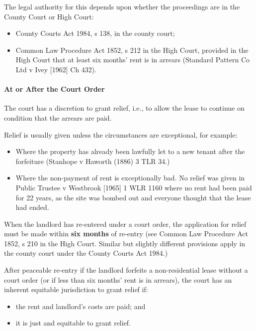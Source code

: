 \documentclass[
]{article}
\providecommand{\tightlist}{%
  \setlength{\itemsep}{0pt}\setlength{\parskip}{0pt}}
\begin{document}
The legal authority for this depends upon whether the proceedings are in
the County Court or High Court:

\begin{itemize}
\tightlist
\item
  County Courts Act 1984, s 138, in the county court;
\item
  Common Law Procedure Act 1852, s 212 in the High Court, provided in
  the High Court that at least six months' rent is in arrears (Standard
  Pattern Co Ltd v Ivey {[}1962{]} Ch 432).
\end{itemize}

\hypertarget{at-or-after-the-court-order}{%
\paragraph{At or After the Court
Order}\label{at-or-after-the-court-order}}

The court has a discretion to grant relief, i.e., to allow the lease to
continue on condition that the arrears are paid.

Relief is usually given unless the circumstances are exceptional, for
example:

\begin{itemize}
\tightlist
\item
  Where the property has already been lawfully let to a new tenant after
  the forfeiture (Stanhope v Haworth (1886) 3 TLR 34.)
\item
  Where the non-payment of rent is exceptionally bad. No relief was
  given in Public Trustee v Westbrook {[}1965{]} 1 WLR 1160 where no
  rent had been paid for 22 years, as the site was bombed out and
  everyone thought that the lease had ended.
\end{itemize}

When the landlord has re-entered under a court order, the application
for relief must be made within \textbf{six months} of re-entry (see
Common Law Procedure Act 1852, s 210 in the High Court. Similar but
slightly different provisions apply in the county court under the County
Courts Act 1984.)

After peaceable re-entry if the landlord forfeits a non-residential
lease without a court order (or if less than six months' rent is in
arrears), the court has an inherent equitable jurisdiction to grant
relief if:

\begin{itemize}
\tightlist
\item
  the rent and landlord's costs are paid; and
\item
  it is just and equitable to grant relief.
\end{itemize}
\end{document}
